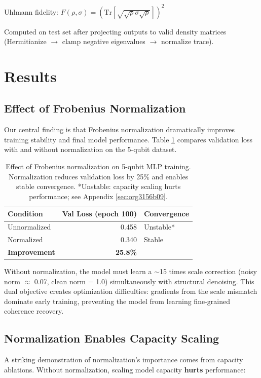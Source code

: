 \documentclass[11pt]{article}
\begin{document}
Uhlmann fidelity: \(F(\rho, \sigma) = (\mathrm{Tr}[\sqrt{\sqrt{\rho}\sigma\sqrt{\rho}}])^2\)

Computed on test set after projecting outputs to valid density matrices (Hermitianize \(\to\) clamp negative eigenvalues \(\to\) normalize trace).
\section{Results}
\label{sec:org31d0013}

\subsection{Effect of Frobenius Normalization}
\label{sec:orgb9c09fc}

Our central finding is that Frobenius normalization dramatically improves training stability and final model performance. Table \ref{tab:org3ea2b94} compares validation loss with and without normalization on the 5-qubit dataset.

\begin{table}[htbp]
\caption{\label{tab:org3ea2b94}Effect of Frobenius normalization on 5-qubit MLP training. Normalization reduces validation loss by 25\% and enables stable convergence. *Unstable: capacity scaling hurts performance; see Appendix \ref{sec:org3156b09}.}
\centering
\begin{tabular}{lrl}
Condition & Val Loss (epoch 100) & Convergence\\
\hline
Unnormalized & 0.458 & Unstable*\\
Normalized & 0.340 & Stable\\
\textbf{Improvement} & \textbf{25.8\%} & \\
\end{tabular}
\end{table}

Without normalization, the model must learn a \(\sim\)15 times scale correction (noisy norm \(\approx\) 0.07, clean norm = 1.0) simultaneously with structural denoising. This dual objective creates optimization difficulties: gradients from the scale mismatch dominate early training, preventing the model from learning fine-grained coherence recovery.
\subsection{Normalization Enables Capacity Scaling}
\label{sec:org6d347f1}

A striking demonstration of normalization's importance comes from capacity ablations. Without normalization, scaling model capacity \textbf{hurts} performance:
\end{document}
